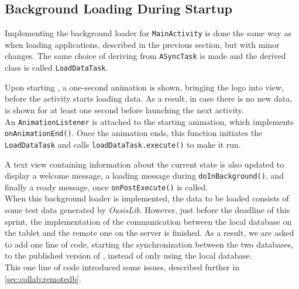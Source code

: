 \subsection{Background Loading During Startup}\label{sec:sprint4:dev:remotedbandbgloading}

Implementing the background loader for \lstinline|MainActivity| is done the same way as when loading applications, described in the previous section, but with minor changes.
The same choice of deriving from \lstinline!ASyncTask! is made and the derived class is called \lstinline!LoadDataTask!.

Upon starting \launcher, a one-second animation is shown, bringing the logo into view, before the activity starts loading data.
As a result, in case there is no new data, \mainactivity is shown for at least one second before launching the next activity.\\

An \lstinline!AnimationListener! is attached to the starting animation, which implements \lstinline|onAnimationEnd()|.
Once the animation ends, this function initiates the \lstinline!LoadDataTask! and calls \lstinline!loadDataTask.execute()! to make it run.

A text view containing information about the current state is also updated to display a welcome message, a loading message during \lstinline|doInBackground()|, and finally a ready message, once \lstinline|onPostExecute()| is called.\\

When this background loader is implemented, the data to be loaded consists of some test data generated by \textit{OasisLib}.
However, just before the deadline of this sprint, the implementation of the communication between the local database on the tablet and the remote one on the server is finished.
As a result, we are asked to add one line of code, starting the synchronization between the two databases, to the published version of \launcher, instead of only using the local database.\\

This one line of code introduced some issues, described further in \cref{sec:collab:remotedb}.